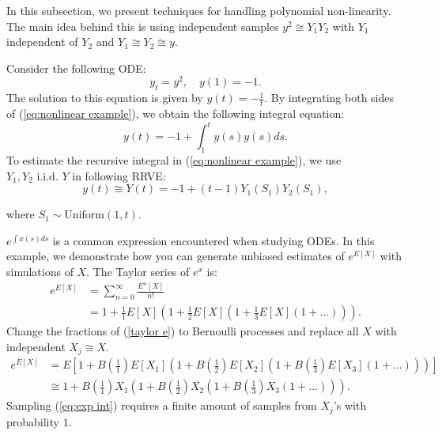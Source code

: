\documentclass[a4paper,12pt]{article}
\begin{document}
In this subsection, we present techniques for handling polynomial non-linearity.
The main idea behind this is using independent samples
$y^{2} \cong Y_{1} Y_{2}$ with $Y_{1}$ independent of $ Y_{2}$ and
$Y_{1} \cong Y_{2} \cong y$.


\begin{example}[$y_t=y^{2}$] \label{ex:nonlinear example}
  Consider the following ODE:
  \begin{equation} \label{eq:nonlinear example}
    y_t = y^2, \quad y(1) = -1.
  \end{equation}
  The solution to this equation is given by $y(t) = -\frac{1}{t}$.
  By integrating both sides of (\ref{eq:nonlinear example}),
  we obtain the following integral equation:
  \begin{equation}
    y(t) = -1 + \int_{1}^{t} y(s) y(s)ds.
  \end{equation}
  To estimate the recursive integral in (\ref{eq:nonlinear example}),
  we use  $Y_1,Y_2 \text{ i.i.d. } Y$ in following RRVE:
  \begin{equation} \label{RRVE: nonlinear example}
    y(t) \cong Y(t) = -1 + (t-1) Y_1(S_{1}) Y_2(S_{1}),
  \end{equation}


  where $S_{1} \sim \text{Uniform}(1,t)$.
\end{example}

\begin{example}[$e^{E[X]}$] \label{ex:exp int}
  $e^{\int x(s)ds}$ is a common expression encountered when studying ODEs.
  In this example, we demonstrate how you can generate unbiased estimates of
  $e^{E[X]}$ with simulations of $X$. The Taylor series of $e^{x}$ is:
  \begin{align}
    e^{E[X]} & = \sum_{n=0}^{\infty} \frac{E^{n}[X]}{n!}     \\
             & = 1 + \frac{1}{1}E[X]\left(1+ \frac{1}{2}E[X]
    \left(1+\frac{1}{3}E[X]\left(1+ ...\right)\right)\right). \label{taylor e}
  \end{align}
  Change the fractions of (\ref{taylor e}) to Bernoulli processes
  and replace all $X$ with independent $X_j \cong X$.
  \begin{align}
    e^{E[X]} & = E
    \left[1 + B\left(\frac{1}{1}\right)E[X_1]
    \left(1+ B\left(\frac{1}{2}\right)E[X_2]
    \left(1+B\left(\frac{1}{3}\right)E[X_3]
    \left(1+ ...\right)
    \right)
    \right)
    \right]                             \\
             & \cong \label{eq:exp int}
    1 + B\left(\frac{1}{1}\right)X_1
    \left(1+ B\left(\frac{1}{2}\right)X_2
    \left(1+B\left(\frac{1}{3}\right)X_3
      \left(1+ ...\right)
      \right)
    \right).
  \end{align}
  Sampling (\ref{eq:exp int}) requires a finite amount of samples from $X_{j}$'s
  with probability $1$.
\end{example}
\end{document}
